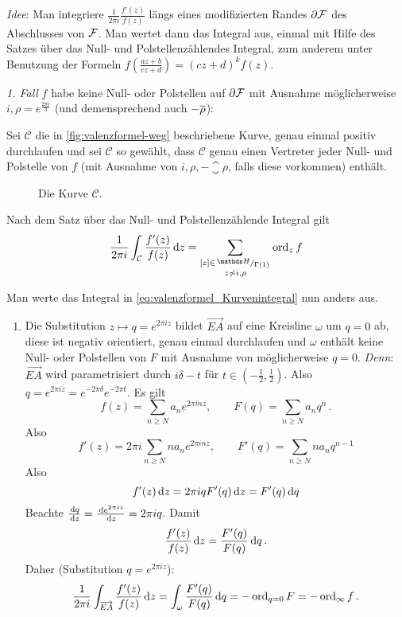 \begin{bewe}
	\emph{Idee}: Man integriere $\frac{1}{2\pi i} \frac{f'(z)}{f(z)}$ längs eines modifizierten Randes $\partial \mathcal{F}$ des Abschlusses von $\mathcal{F}$.
	Man wertet dann das Integral aus, einmal mit Hilfe des Satzes über das Null- und Polstellenzählendes Integral, zum anderem unter Benutzung der Formeln $f(\frac{az+b}{cz+d}) = (cz+d)^k f(z)$.
	
	\emph{1. Fall} $f$ habe keine Null- oder Polstellen auf $\partial \mathcal{F}$ mit Ausnahme möglicherweise $i, \rho = e^{\frac{2\pi i}{3}}$ (und demensprechend auch $-\overline{\rho}$):
	
	Sei $\mathcal C$ die in \autoref{fig:valenzformel-weg} beschriebene Kurve, genau einmal positiv durchlaufen und sei $\mathcal C$ so gewählt, dass $\mathcal C$ genau einen Vertreter jeder Null- und Polstelle von $f$ (mit Ausnahme von $i, \rho, -\closure\rho$, falls diese vorkommen) enthält.
	
	\begin{figure}
	\begin{center}
		
		\caption{Die Kurve $\mathcal C$.}
		\label{fig:valenzformel-weg}
	\end{center}
	\end{figure}
	
	Nach dem Satz über das Null- und Polstellenzählende Integral gilt
	\begin{equation}\label{eq:valenzformel_Kurvenintegral}
	\frac{1}{2\pi i} \int_{\mathcal C} \frac{f'(z)}{f(z)} \opd z = \sum_{\substack{[z] \in \modulo{\HH}{\Gamma(1)} \\ z \not\sim i, \rho}} \ord_z f
	\end{equation}
	
	Man werte das Integral in \eqref{eq:valenzformel_Kurvenintegral} nun anders aus.
	
	\begin{enumerate}
		\item Die Substitution $z \mapsto q = e^{2\pi iz}$ bildet $\overrightarrow{EA}$ auf eine Kreisline $\omega$ um $q=0$ ab, diese ist negativ orientiert, genau einmal durchlaufen und $\omega$ enthält keine Null- oder Polstellen von $F$ mit Ausnahme von möglicherweise $q=0$.
		\emph{Denn}: $\overrightarrow{EA}$ wird parametrisiert durch $i\delta - t$ für $t \in (-\frac{1}{2}, \frac{1}{2})$.
		Also $q = e^{2\pi iz} = e^{-2\pi\delta} e^{-2\pi t}$.
		Es gilt
		\[
		f(z) = \sum_{n \geq N} a_n e^{2\pi inz},
		\qquad F(q) = \sum_{n \geq N} a_n q^n
		\,.
		\]
		Also
		\[
		f'(z) = 2\pi i \sum_{n\geq N} na_n e^{2\pi inz},
		\qquad F'(q) = \sum_{n \geq N} n a_nq^{n-1}
		\]
		Also
		\[
		f'(z) \,\mathrm{d} z = 2\pi iq F'(q) \,\mathrm{d} z = F'(q) \,\mathrm{d} q
		\]
		Beachte $\derive[q] = \derive[e^{2\pi iz}] = 2\pi i q$.
		Damit
		\[
		\frac{f'(z)}{f(z)} \,\mathrm{d} z = \frac{F'(q)}{F(q)} \,\mathrm{d} q
		\,.
		\]
		Daher (Substitution $q = e^{2\pi iz}$):
		\[
		\frac{1}{2\pi i} \int_{\overrightarrow{EA}} \frac{f'(z)}{f(z)} \,\mathrm{d} z
		= \int_\omega \frac{F'(q)}{F(q)} \,\mathrm{d} q = - \operatorname{ord}_{q=0} F = - \operatorname{ord}_\infty f\,.
		\]
		

\end{enumerate}
\end{bewe}
